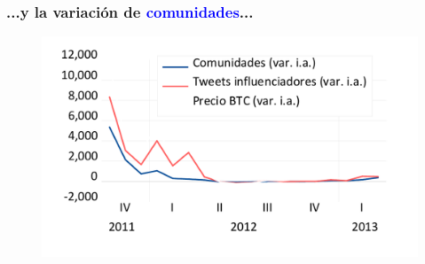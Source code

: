 \begin{frame}
\frametitle{...y la variación de \textcolor{blue}{comunidades}...}

\begin{figure}[H]
    \begin{center}
         \includegraphics[width=1\textwidth]{images/C3/results/times_series_result_02.pdf}
     \end{center}
\end{figure}


\end{frame}


